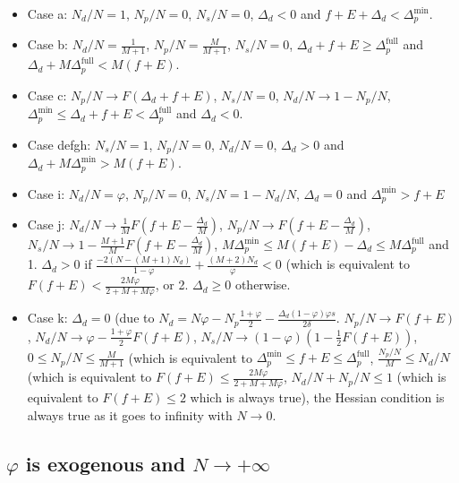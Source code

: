 \documentclass[english, a4paper]{article}
\theoremstyle{plain}
\theoremstyle{definition}
\theoremstyle{remark}
\begin{document}
    \begin{itemize}
        \item Case a: $N_d / N = 1$, $N_p / N = 0$, $N_s / N = 0$, $\Delta_d < 0$ and $f + E + \Delta_d < \Delta_p^{\text{min}}$.
        \item Case b: $N_d / N = \frac{1}{M + 1}$, $N_p / N = \frac{M}{M + 1}$, $N_s / N= 0$, $\Delta_d + f + E \geq \Delta_p^{\text{full}}$ and $\Delta_d + M\Delta_p^{\text{full}} < M(f+ E)$.
        \item Case c: $N_p / N \rightarrow F(\Delta_d + f + E)$, $N_s / N = 0$, $N_d / N \rightarrow 1 - N_p / N$, $\Delta_p^{\text{min}} \leq \Delta_d + f + E < \Delta_p^{\text{full}}$ and $\Delta_d < 0$.
        \item Case defgh: $N_s / N = 1$, $N_p / N = 0$, $N_d / N = 0$, $\Delta_d > 0$ and $\Delta_d + M\Delta_p^{\text{min}} > M(f + E)$.
        \item Case i: $N_d / N = \varphi$, $N_p / N = 0$, $N_s / N = 1 - N_d / N$, $\Delta_d = 0$ and $\Delta_p^{\text{min}} > f + E$
        \item Case j: $N_d / N \rightarrow \frac{1}{M} F\left( f + E - \frac{\Delta_d}{M} \right)$, $N_p / N \rightarrow F\left( f + E - \frac{\Delta_d}{M} \right)$, $N_s / N \rightarrow 1 - \frac{M+ 1}{M}F\left( f + E - \frac{\Delta_d}{M} \right)$, $M\Delta_p^{\text{min}} \leq M(f + E) - \Delta_d \leq M\Delta_p^{\text{full}}$ and 1. $\Delta_d > 0$ if $\frac{-2(N - (M + 1)N_d)}{1 - \varphi} + \frac{(M+ 2)N_d}{\varphi} < 0$ (which is equivalent to $F(f + E) < \frac{2M\varphi}{2 + M + M\varphi}$, or 2. $\Delta_d \geq 0$ otherwise. 
        \item Case k: $\Delta_d = 0$ (due to $N_d = N\varphi - N_p\frac{1 + \varphi}{2} - \frac{\Delta_d(1 - \varphi)\varphi s}{2\delta}$. $N_p / N \rightarrow F(f + E)$, $N_d / N \rightarrow \varphi - \frac{1 + \varphi}{2} F(f + E)$, $N_s /N \rightarrow (1 - \varphi)\left( 1 - \frac{1}{2}F(f + E)\right)$, $0\leq N_p / N \leq \frac{M}{M + 1}$ (which is equivalent to $\Delta_p^{\text{min}} \leq f + E \leq \Delta_p^{\text{full}}$, $\frac{N_p / N}{M} \leq N_d / N$ (which is equivalent to $F(f + E)\leq \frac{2M\varphi}{2 + M + M\varphi}$, $N_d / N + N_p / N \leq 1$ (which is equivalent to $F(f + E) \leq 2$ which is always true), the Hessian condition is always true as it goes to infinity with $N \rightarrow 0$.
    \end{itemize}

    \subsection{$\varphi$ is exogenous and $N \rightarrow +\infty$}
\end{document}
